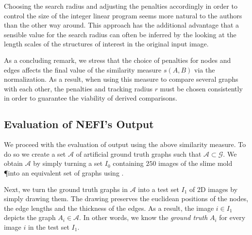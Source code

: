 
		Choosing the search radius and adjusting the penalties accordingly in order to control the size of the integer linear program seems more natural to the authors than the other way around. This approach has the additional advantage that a sensible value for the search radius can often be inferred by the looking at the length scales of the structures of interest in the original input image.


		As a concluding remark, we stress that the choice of penalties for nodes and edges affects the final value of the similarity measure $s(A, B)$ via the normalization. As a result, when using this measure to compare several graphs with each other, the penalties and tracking radius $r$ must be chosen consistently in order to guarantee the viability of derived comparisons.

	\subsection{Evaluation of NEFI's Output}\label{sec:evaluation}

		We proceed with the evaluation of \NEFIs output using the above similarity measure. To do so we create a set $\mathcal{A}$ of artificial ground truth graphs such that $\mathcal{A} \subset \mathcal{G}$. We obtain $\mathcal{A}$ by simply turning a set $I_0$ containing $250$ images of the slime mold \P into an equivalent set of graphs using \NEFI. 

		Next, we turn the ground truth graphs in $\mathcal{A}$ into a test set $I_1$ of 2D images by simply drawing them. The drawing preserves the euclidean positions of the nodes, the edge lengths and the thickness of the edges. As a result, the image $i \in I_1$ depicts the graph $ A_i \in \mathcal{A}$. In other words, we know the \emph{ground truth} $A_i$ for every image $i$ in the test set $I_1$. %

